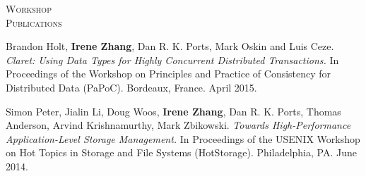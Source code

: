 \documentclass[10pt,times]{report}
\newlength{\sectiongap}
\newlength{\sectioncolwidth}
\newlength{\colgap}
\newlength{\stuffwidth}
\newenvironment{rtable}{
  \begin{minipage}{\textwidth}
  }{
  \end{minipage}
}
\newenvironment{rsection}[1]{
  \begin{minipage}[t]{\sectioncolwidth}
    \textsc{#1}
  \end{minipage}
  \hspace{\colgap}
  \begin{minipage}[t]{\stuffwidth}
  }{
    \removelastskip
  \end{minipage}
  \\[\sectiongap]
}
\begin{document}
\begin{rtable}
  
  \begin{rsection}{Workshop\\Publications}
    Brandon Holt, \textbf{Irene Zhang}, Dan R. K. Ports, Mark Oskin and Luis
    Ceze.  \textit{Claret: Using Data Types for Highly Concurrent
      Distributed Transactions.} In Proceedings of the Workshop on
    Principles and Practice of Consistency for Distributed Data
    (PaPoC).  Bordeaux, France. April 2015.\\\vspace{-0.5em}


    Simon Peter, Jialin Li, Doug Woos, \textbf{Irene Zhang}, Dan
    R. K. Ports, Thomas Anderson, Arvind Krishnamurthy, Mark
    Zbikowski. \textit{Towards High-Performance Application-Level
      Storage Management.} In Proceedings of the
    USENIX Workshop on Hot Topics in Storage and File Systems (HotStorage). Philadelphia, PA. June 2014.\\\vspace{-0.5em}
  \end{rsection}
\end{rtable}
\end{document}
